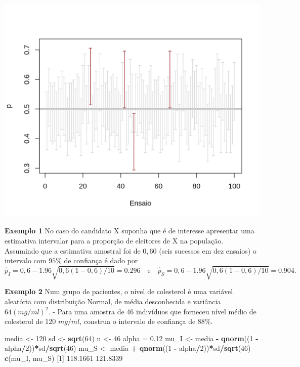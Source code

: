 \documentclass[10pt,a4paper]{book}
\newenvironment{Shaded}{\begin{snugshade}}{\end{snugshade}}
\newcommand{\KeywordTok}[1]{\textcolor[rgb]{0.13,0.29,0.53}{\textbf{#1}}}
\newcommand{\DecValTok}[1]{\textcolor[rgb]{0.00,0.00,0.81}{#1}}
\newcommand{\FloatTok}[1]{\textcolor[rgb]{0.00,0.00,0.81}{#1}}
\newcommand{\StringTok}[1]{\textcolor[rgb]{0.31,0.60,0.02}{#1}}
\newcommand{\OperatorTok}[1]{\textcolor[rgb]{0.81,0.36,0.00}{\textbf{#1}}}
\newcommand{\NormalTok}[1]{#1}
\begin{document}
\begin{center}\includegraphics{figures/unnamed-chunk-384-1} \end{center}

\textbf{Exemplo 1} No caso do candidato X suponha que é de interesse
apresentar uma estimativa intervalar para a proporção de eleitores de X
na população. Assumindo que a estimativa amostral foi de \(0,60\) (seis
sucessos em dez ensaios) o intervalo com \(95\%\) de confiança é dado
por \[
\hat{p}_I = 0,6 - 1.96\sqrt{0,6(1-0,6)/10} = 0.296 \quad \text{e} \quad \hat{p}_S = 0,6 - 1.96\sqrt{0,6(1-0,6)/10} = 0.904.
\]

\textbf{Exemplo 2} Num grupo de pacientes, o nível de colesterol é uma
variável aleatória com distribuição Normal, de média desconhecida e
variância \(64 (mg/ml)^2\). - Para uma amostra de 46 indivíduos que
forneceu nível médio de colesterol de 120 \(mg/ml\), construa o
intervalo de confiança de \(88\%\).

\begin{Shaded}
\begin{Highlighting}[]
\NormalTok{media <-}\StringTok{ }\DecValTok{120}
\NormalTok{sd <-}\StringTok{ }\KeywordTok{sqrt}\NormalTok{(}\DecValTok{64}\NormalTok{)}
\NormalTok{n <-}\StringTok{ }\DecValTok{46}
\NormalTok{alpha =}\StringTok{ }\FloatTok{0.12}
\NormalTok{mu_I <-}\StringTok{ }\NormalTok{media }\OperatorTok{-}\StringTok{ }\KeywordTok{qnorm}\NormalTok{((}\DecValTok{1} \OperatorTok{-}\StringTok{ }\NormalTok{alpha}\OperatorTok{/}\DecValTok{2}\NormalTok{))}\OperatorTok{*}\NormalTok{sd}\OperatorTok{/}\KeywordTok{sqrt}\NormalTok{(}\DecValTok{46}\NormalTok{)}
\NormalTok{mu_S <-}\StringTok{ }\NormalTok{media }\OperatorTok{+}\StringTok{ }\KeywordTok{qnorm}\NormalTok{((}\DecValTok{1} \OperatorTok{-}\StringTok{ }\NormalTok{alpha}\OperatorTok{/}\DecValTok{2}\NormalTok{))}\OperatorTok{*}\NormalTok{sd}\OperatorTok{/}\KeywordTok{sqrt}\NormalTok{(}\DecValTok{46}\NormalTok{)}
\KeywordTok{c}\NormalTok{(mu_I, mu_S)}
\NormalTok{[}\DecValTok{1}\NormalTok{] }\FloatTok{118.1661} \FloatTok{121.8339}
\end{Highlighting}
\end{Shaded}
\end{document}
